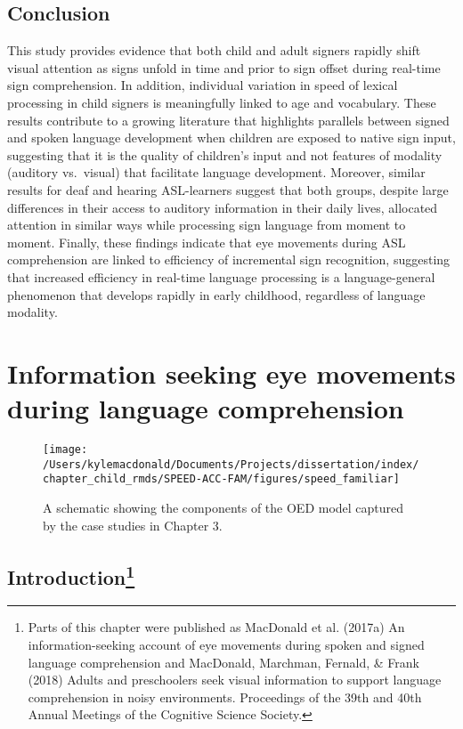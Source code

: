 \documentclass[oneside]{report}
\begin{document}
\section{Conclusion}\label{conclusion}

This study provides evidence that both child and adult signers rapidly
shift visual attention as signs unfold in time and prior to sign offset
during real-time sign comprehension. In addition, individual variation
in speed of lexical processing in child signers is meaningfully linked
to age and vocabulary. These results contribute to a growing literature
that highlights parallels between signed and spoken language development
when children are exposed to native sign input, suggesting that it is
the quality of children's input and not features of modality (auditory
vs.~visual) that facilitate language development. Moreover, similar
results for deaf and hearing ASL-learners suggest that both groups,
despite large differences in their access to auditory information in
their daily lives, allocated attention in similar ways while processing
sign language from moment to moment. Finally, these findings indicate
that eye movements during ASL comprehension are linked to efficiency of
incremental sign recognition, suggesting that increased efficiency in
real-time language processing is a language-general phenomenon that
develops rapidly in early childhood, regardless of language modality.

\chapter{Information seeking eye movements during language
comprehension}\label{speed-fam}
\begin{figure}[t]

{\centering \texttt{[image: /Users/kylemacdonald/Documents/Projects/dissertation/index/chapter\_child\_rmds/SPEED-ACC-FAM/figures/speed\_familiar]} 

}

\caption{A schematic showing the components of the OED model captured by the case studies in Chapter 3.}\label{fig:schematic-speed-fam}
\end{figure}
\section[Introduction]{\texorpdfstring{Introduction\footnote{Parts of
  this chapter were published as MacDonald et al. (2017a) An
  information-seeking account of eye movements during spoken and signed
  language comprehension and MacDonald, Marchman, Fernald, \& Frank
  (2018) Adults and preschoolers seek visual information to support
  language comprehension in noisy environments. Proceedings of the 39th
  and 40th Annual Meetings of the Cognitive Science Society.}}{Introduction}}\label{introduction-2}
\end{document}
